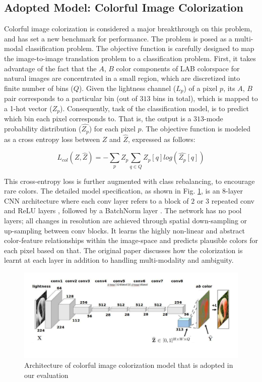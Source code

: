 \documentclass[10pt]{article}
\begin{document}
\subsection{\textbf{Adopted Model: Colorful Image Colorization}}
Colorful image colorization \cite{zhang2016colorful} is considered a major breakthrough on this problem, and has set a new benchmark for performance.
The problem is posed as a multi-modal classification problem. The objective function is carefully designed to map the image-to-image translation problem to a classification problem.
First, it takes advantage of the fact that the $A$, $B$ color components of LAB colorspace for natural images are concentrated in a small region, which are discretized into finite number of bins ($Q$). 
Given the lightness channel ($L_p$) of a pixel $p$, its $A$, $B$ pair corresponds to a particular bin (out of $313$ bins in total), which is mapped to a 1-hot vector ($Z_p$). 
Consequently, task of the classification model, is to predict which bin each pixel corresponds to. That is, the output is a $313$-mode probability distribution ($ \hat{Z_p}$) for each pixel $p$.
The objective function is modeled as a cross entropy loss between $Z$ and $\hat{Z}$, expressed as follows: 

\[ L_{col}(Z, \hat{Z}) = - \sum_p Z_p \sum_{q \in Q} Z_p[q] log(\hat{Z_p}[q])   \] 

This cross-entropy loss is further augmented with class rebalancing, to encourage rare colors. The detailed model specification, as shown in Fig. \ref{fig:col_main}, is an 8-layer CNN architecture where each
conv layer refers to a block of $2$ or $3$ repeated conv and ReLU layers \cite{nair2010rectified}, followed by a BatchNorm layer \cite{ioffe2015batch}. The network has no pool layers; all changes in
resolution are achieved through spatial down-sampling or up-sampling between conv blocks. It learns the highly non-linear and abstract color-feature relationships within the image-space and predicts
plausible colors for each pixel based on that. The original paper discusses how the colorization is learnt at each layer in addition to handling multi-modality and ambiguity. 


\begin{figure}[h]
\includegraphics[width=0.8 \linewidth]{Figs/7.pdf} 
\vspace{-10mm}
\caption{Architecture of colorful image colorization model \cite{zhang2016colorful} that is adopted in our evaluation}
\label{fig:col_main}
\end{figure}  
\end{document}
